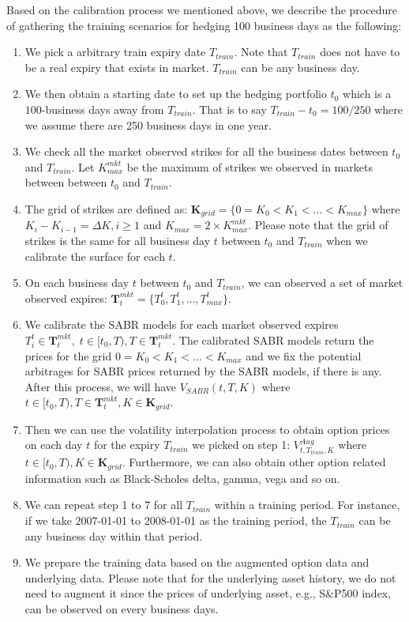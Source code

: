 \documentclass[letterpaper,12pt,titlepage,oneside,final]{book}
\numberwithin{equation}{section}
\theoremstyle{definition}
\begin{document}
Based on the calibration process we mentioned above, we describe the procedure of gathering the training scenarios for hedging 100 business days  as the following:
\begin{enumerate}
	\item We pick a arbitrary train expiry date $T_{train}$. Note that  $T_{train}$ does not have to be a real expiry that exists in market. $T_{train}$ can be any business day.
	\item We then obtain  a starting date to set up the hedging portfolio $t_0$ which is  a $100$-business days away from $T_{train}$. That is to say $T_{train}-t_0=100/250$ where we assume there are 250 business days in one year. 
	\item We check all the market observed strikes for all the business dates between $t_0$ and  $T_{train}$. Let $K^{mkt}_{max}$ be the maximum of  strikes we observed in markets between between $t_0$ and  $T_{train}$. 
	\item  The grid of strikes are defined as: $\mathbf{K}_{grid}=\{0=K_0<K_1<\dots<K_{max}\}$ where $K_i-K_{i-1}=\Delta K, i \geq 1$ and $K_{max}=2 \times K^{mkt}_{max}$. Please note that the grid of strikes is the same for all business day $t$ between  $t_0$ and  $T_{train}$ when we calibrate the surface for each $t$.
	\item On each business day $t$ between  $t_0$ and  $T_{train}$, we can observed a set of market observed expires: $\mathbf{T}_t^{mkt}=\{T_0^{t},T_1^{t},\dots,T_{max}^{t}\}$.
	
	
	\item  We calibrate the SABR models for each market observed expires $T_i^{t} \in \mathbf{T}_t^{mkt},	\;  t \in [t_0, T),T \in \mathbf{T}_t^{mkt}$. The calibrated SABR models return the prices  for the grid $0=K_0<K_1<\dots<K_{max}$ and we fix the potential arbitrages for SABR prices returned by the SABR models, if there is any. After this process, we will have $V_{SABR}(t,T,K)$ where $t \in [t_0, T), T \in \mathbf{T}_t^{mkt}, K \in \mathbf{K}_{grid}$.
	\item Then we can use the  volatility interpolation process \cite{andreasen2010volatility} to obtain option prices on each day $t$ for the expiry $T_{train}$ we picked on step 1: $V^{Aug}_{t,T_{train},K}$ where $t \in [t_0, T), K \in \mathbf{K}_{grid}$.  Furthermore, we can also obtain other option related information such as Black-Scholes delta, gamma, vega and so on.
	
	\item We can repeat step 1 to 7 for all $T_{train}$ within a training period. For instance, if we take 2007-01-01 to 2008-01-01 as the training period, the $T_{train}$ can be  any business day within that period.
	\item We prepare the training data based on the augmented option data and underlying data. Please note that for the underlying asset history, we do not need to augment it since the prices of underlying asset, e.g., S\&P500 index, can be observed  on every business days. 
\end{enumerate}
\end{document}
